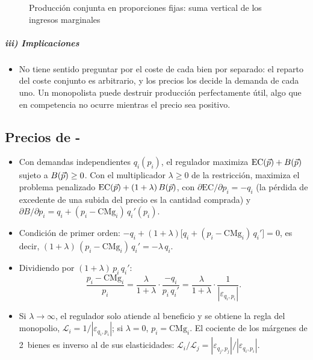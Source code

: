 \documentclass[11pt]{article}
\begin{document}
\begin{figure}[H]
\centering
\caption{Producción conjunta en proporciones fijas: suma vertical de los ingresos marginales}\label{fig:produccion-conjunta}
\end{figure}

\subparagraph{iii) Implicaciones}

\begin{itemize}
\item No tiene sentido preguntar por el coste de cada bien por separado: el reparto del coste conjunto es arbitrario, y los precios los decide la demanda de cada uno. Un monopolista puede destruir producción perfectamente útil, algo que en competencia no ocurre mientras el precio sea positivo.
\end{itemize}

\subsection{Precios de -}\label{anexo:ramsey}

\begin{itemize}
\item Con demandas independientes $q_i(p_i)$, el regulador maximiza $\mathrm{EC}(\vec{p})+B(\vec{p})$ sujeto a $B(\vec{p})\geq 0$. Con el multiplicador $\lambda\geq 0$ de la restricción, maximiza el problema penalizado $\mathrm{EC}(\vec{p})+(1+\lambda)\,B(\vec{p})$, con $\partial\mathrm{EC}/\partial p_i=-q_i$ (la pérdida de excedente de una subida del precio es la cantidad comprada) y $\partial B/\partial p_i=q_i+(p_i-\mathrm{CMg}_i)\,q_i'(p_i)$.
\item Condición de primer orden: $-q_i+(1+\lambda)\big[q_i+(p_i-\mathrm{CMg}_i)\,q_i'\big]=0$, es decir, $(1+\lambda)\,(p_i-\mathrm{CMg}_i)\,q_i'=-\lambda\,q_i$.
\item Dividiendo por $(1+\lambda)\,p_i\,q_i'$:
  \begin{equation}
  \frac{p_i-\mathrm{CMg}_i}{p_i}=\frac{\lambda}{1+\lambda}\cdot\frac{-q_i}{p_i\,q_i'}=\frac{\lambda}{1+\lambda}\cdot\frac{1}{|\varepsilon_{q_i,p_i}|}.
  \end{equation}
  \findemo
\item Si $\lambda\to\infty$, el regulador solo atiende al beneficio y se obtiene la regla del monopolio, $\mathcal{L}_i=1/|\varepsilon_{q_i,p_i}|$; si $\lambda=0$, $p_i=\mathrm{CMg}_i$. El cociente de los márgenes de 2~bienes es inverso al de sus elasticidades: $\mathcal{L}_i/\mathcal{L}_j=|\varepsilon_{q_j,p_j}|/|\varepsilon_{q_i,p_i}|$.
\end{itemize}
\end{document}

